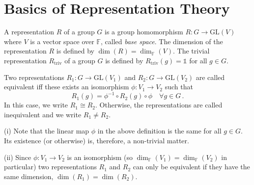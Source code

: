 

\section{Basics of Representation Theory}

\begin{definition}
A representation $R$ of a group $G$ is a group homomorphism $R: G \rightarrow \mathrm{GL}(V)$ where $V$ is a vector space over $\mathbb{F}$, called \emph{base space}.
The dimension of the representation $R$ is defined by $\operatorname{dim}(R)=\operatorname{dim}_{\mathbb{F}}(V)$.
The trivial representation $R_{\text{triv}}$ of a group $G$ is defined by $R_{\text{triv}}(g)=\mathbb{1}$ for all $g \in G$.
\end{definition}


\begin{definition}
Two representations $R_{1}: G \rightarrow \mathrm{GL}\left(V_{1}\right)$ and $R_{2}: G \rightarrow \mathrm{GL}\left(V_{2}\right)$ are called equivalent iff these exists an isomorphism $\phi: V_{1} \rightarrow V_{2}$ such that
\begin{equation*}
R_{1}(g)=\phi^{-1} \circ R_{2}(g) \circ \phi \quad \forall g \in G\,.
\end{equation*}
In this case, we write $R_{1} \cong R_{2}$. Otherwise, the representations are called inequivalent and we write $R_{1} \neq R_{2}$.

(i) Note that the linear map $\phi$ in the above definition is the same for all $g \in G$. Its existence (or otherwise) is, therefore, a non-trivial matter.

(ii) Since $\phi: V_{1} \rightarrow V_{2}$ is an isomorphism (so $\operatorname{dim}_{\mathbb{F}}\left(V_{1}\right)=\operatorname{dim}_{\mathbb{F}}\left(V_{2}\right)$ in particular) two representations $R_{1}$ and $R_{2}$ can only be equivalent if they have the same dimension, $\operatorname{dim}\left(R_{1}\right)=\operatorname{dim}\left(R_{2}\right)$.
\end{definition}


